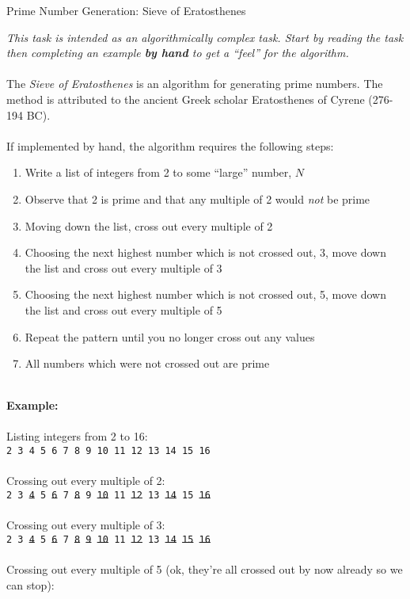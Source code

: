 \documentclass{lab}
\begin{document}
\pagebreak
\begin{task}{Prime Number Generation: Sieve of Eratosthenes}{}

\textit{This task is intended as an algorithmically complex task. Start by reading the task then completing an example \textbf{by hand} to get a ``feel'' for the algorithm.}
\\~\\
The \textit{Sieve of Eratosthenes} is an algorithm for generating prime numbers. The method is attributed to the ancient Greek scholar Eratosthenes of Cyrene (276-194 BC).
\\~\\
If implemented by hand, the algorithm requires the following steps:

\begin{enumerate}
\item Write a list of integers from 2 to some ``large'' number, $N$
\item Observe that 2 is prime and that any multiple of 2 would \textit{not} be prime
\item Moving down the list, cross out every multiple of 2
\item Choosing the next highest number which is not crossed out, 3, move down the list and cross out every multiple of 3
\item Choosing the next highest number which is not crossed out, 5, move down the list and cross out every multiple of 5
\item Repeat the pattern until you no longer cross out any values
\item All numbers which were not crossed out are prime
\end{enumerate}
~\\
\textbf{Example:}
\\~\\
Listing integers from 2 to 16:\\
\texttt{2 3 4 5 6 7 8 9 10 11 12 13 14 15 16}
\\~\\
Crossing out every multiple of 2:\\
\texttt{2 3 \st{4} 5 \st{6} 7 \st{8} 9 \st{10} 11 \st{12} 13 \st{14} 15 \st{16}}
\\~\\
Crossing out every multiple of 3:\\
\texttt{2 3 \st{4} 5 \st{6} 7 \st{8} \st{9} \st{10} 11 \st{12} 13 \st{14} \st{15} \st{16}}
\\~\\
Crossing out every multiple of 5 (ok, they're all crossed out by now already so we can stop):\\

\end{task}
\end{document}
